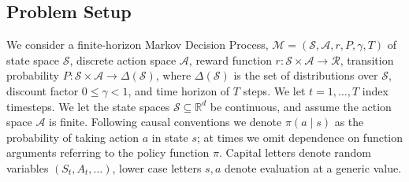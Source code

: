 \documentclass[opre,nonblindrev]{informs4}
\begin{document}
\subsection{Problem Setup}
We consider a finite-horizon Markov Decision Process, $\mathcal M = (\mathcal{S}, \mathcal{A}, r, P, \gamma, T)$ of state space $\mathcal{S}$, discrete action space $\mathcal{A}$, reward function $r: \mathcal{S}\times\mathcal{A} \to \mathcal{R} $, transition probability $P\colon \mathcal{S} \times \mathcal{A} \rightarrow \Delta(\mathcal{S})$, where  $\Delta(\mathcal{S})$ is the set of distributions over $\mathcal{S}$, discount factor $0\leq \gamma<1$, and time horizon of $T$ steps. We let $t=1, \dots, T$ index timesteps. We let the state spaces $\mathcal{S}\subseteq \mathbb{R}^d$ be continuous, and assume the action space $\mathcal{A}$ is finite.
Following causal conventions we denote $\pi(a\mid s)$ as the probability of taking action $a$ in state $s$; at times we omit dependence on function arguments referring to the policy function $\pi$. %
Capital letters denote random variables $(S_t, A_t, …)$, lower case letters $s,a$  denote evaluation at a generic value. %
\end{document}
